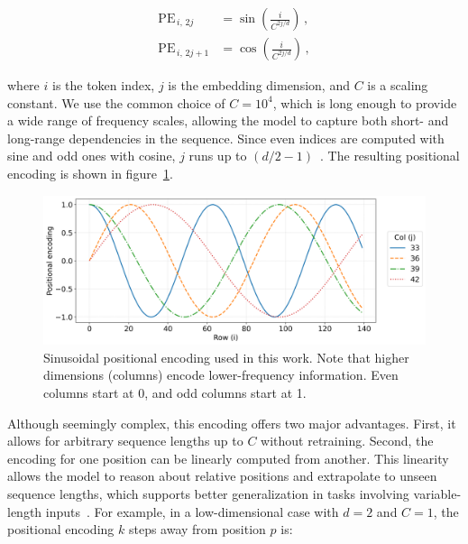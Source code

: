 \begin{align}
\label{eq:positional_encoding_even}
	\mathrm{PE}_{ \,i, \, 2j} & = \sin \left( \frac{i}{C^{2j/d}} \right) \,,\\
\label{eq:positional_encoding_odd}
	\mathrm{PE}_{\, i, \, 2j+1} & = \cos \left( \frac{i}{C^{2j/d}} \right)	\,,
\end{align}

\noindent where $i$ is the token index, $j$ is the embedding dimension, and $C$ is a scaling constant. We use the common choice of $C = 10^4$, which is long enough to provide a wide range of frequency scales, allowing the model to capture both short- and long-range dependencies in the sequence. Since even indices are computed with sine and odd ones with cosine, $j$ runs up to $(d/2 -1)$~\cite{vaswani_attention_2023, murphy_probabilistic_2022}. The resulting positional encoding is shown in  figure~\ref{fig:positional_encoding}.


\begin{figure}[t]
    \centering
    \includegraphics[width=0.95\linewidth]{figures/04_transformer/Positional_encoding.png}
    \caption{Sinusoidal positional encoding used in this work. Note that higher dimensions (columns) encode lower-frequency information. Even columns start at 0, and odd columns start at 1.} 
\label{fig:positional_encoding}
\end{figure}

Although seemingly complex, this encoding offers two major advantages. First, it allows for arbitrary sequence lengths up to $C$ without retraining. Second, the encoding for one position can be linearly computed from another. This linearity allows the model to reason about relative positions and extrapolate to unseen sequence lengths, which supports better generalization in tasks involving variable-length inputs~\cite{murphy_probabilistic_2022, vaswani_attention_2023}. For example, in a low-dimensional case with $d=2$ and $C=1$, the positional encoding $k$ steps away from position $p$ is:


